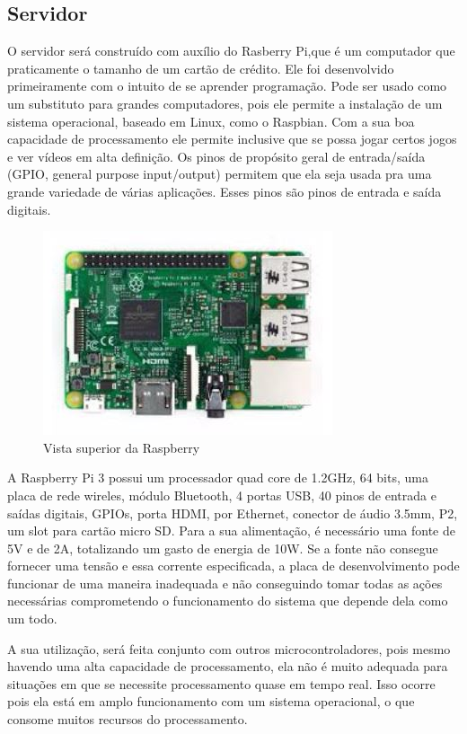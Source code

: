\subsection{Servidor}
O servidor será construído com auxílio do Rasberry Pi,que é um computador que praticamente o tamanho de um cartão de crédito. Ele foi desenvolvido primeiramente com o intuito de se aprender programação.
Pode ser usado como um substituto para grandes computadores, pois ele permite a
instalação de um sistema operacional, baseado em Linux, como o Raspbian. Com a sua
boa capacidade de processamento ele permite inclusive que se possa jogar certos jogos e
ver vídeos em alta definição. Os pinos de propósito geral de entrada/saída (GPIO,
general purpose input/output) permitem que ela seja usada pra uma grande variedade de
várias aplicações. Esses pinos são pinos de entrada e saída digitais.
 \begin{figure}[H]
 	\begin{center}
 		\includegraphics[scale = 0.75]{figuras/Rasp.JPG}
 		\caption{Vista superior da Raspberry}
 	\end{center}
 \end{figure}
A Raspberry Pi 3 possui um processador quad core de 1.2GHz, 64 bits, uma
placa de rede wireles, módulo Bluetooth, 4 portas USB, 40 pinos de entrada e saídas digitais, GPIOs, porta HDMI, por Ethernet, conector de áudio 3.5mm, P2, um slot para cartão micro SD.
Para a sua alimentação, é necessário uma fonte de 5V e de 2A, totalizando um
gasto de energia de 10W. Se a fonte não consegue fornecer uma tensão e essa corrente especificada, a placa de desenvolvimento pode funcionar de uma maneira inadequada e não conseguindo tomar todas as ações necessárias comprometendo o funcionamento do sistema que depende dela como um todo.

A sua utilização, será feita conjunto com outros microcontroladores, pois mesmo
havendo uma alta capacidade de processamento, ela não é muito adequada para
situações em que se necessite processamento quase em tempo real. Isso ocorre pois ela
está em amplo funcionamento com um sistema operacional, o que consome muitos
recursos do processamento.

